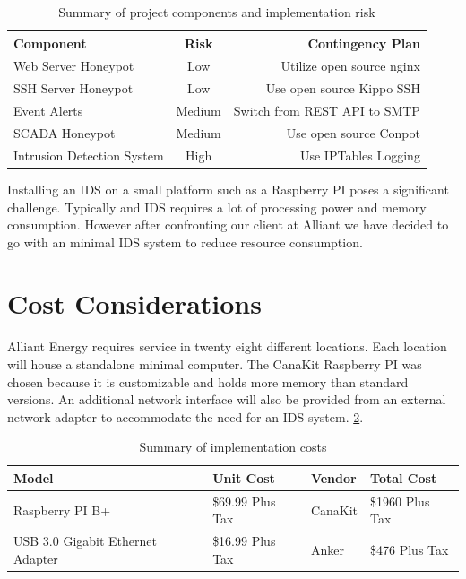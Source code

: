 \vspace{0.5cm}
\begin{table}[h]
\centering
\begin{tabular}{l  c  r}
Component & Risk & Contingency Plan \\
\hline
Web Server Honeypot & Low & Utilize open source nginx\footnotemark[7] \\
SSH Server Honeypot & Low & Use open source Kippo SSH\footnotemark[8] \\
Event Alerts & Medium & Switch from REST API to SMTP \\
SCADA Honeypot & Medium & Use open source Conpot\footnotemark[9] \\
Intrusion Detection System & High &  Use IPTables Logging \\
\end{tabular}
\caption{Summary of project components and implementation risk}
\label{table:risk}
\end{table}
\vspace{0.3cm}

\addtocounter{footnote}{7}

\addtocounter{footnote}{1}

\addtocounter{footnote}{1}

Installing an IDS on a small platform such as a Raspberry PI poses a significant challenge. Typically and IDS requires a lot of processing power and memory consumption.  However after confronting our client at Alliant we have decided to go with an minimal  IDS system to reduce resource consumption.
\section{Cost Considerations}

Alliant Energy requires service in twenty eight different locations. Each location will house a standalone minimal computer. The CanaKit Raspberry PI was chosen because it is customizable and holds more memory than standard versions. An additional network interface will also be provided from an external network adapter to accommodate the need for an IDS system. \ref{table:cost}.

\vspace{0.5cm}
\begin{table}[h]
\centering
\begin{tabular}{l l l l}
Model & Unit Cost & Vendor & Total Cost \\
\hline
Raspberry PI B+ & \$69.99 Plus Tax & CanaKit & \$1960 Plus Tax\footnotemark \\
\hline
USB 3.0 Gigabit Ethernet Adapter & \$16.99 Plus Tax & Anker & \$476 Plus Tax\footnotemark\\
\end{tabular}
\caption{Summary of implementation costs}
\label{table:cost}
\end{table}
\vspace{0.5cm}

